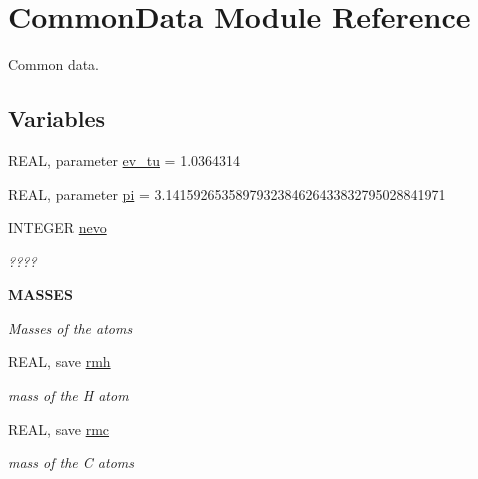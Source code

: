 \hypertarget{namespace_common_data}{
\section{CommonData Module Reference}
\label{namespace_common_data}
}


Common data.  
\subsection*{Variables}
\begin{DoxyCompactItemize}
\item 
REAL, parameter \hyperlink{namespace_common_data_a425e3890d3344a540420425e443dc800}{ev\_\-tu} = 1.0364314
\item 
REAL, parameter \hyperlink{namespace_common_data_a565ffab49e04f2d30ebed2b70485cbb2}{pi} = 3.1415926535897932384626433832795028841971
\item 
INTEGER \hyperlink{namespace_common_data_a976b903826d3d0278c77a43ee3d29754}{nevo}
\begin{DoxyCompactList}\small\item\em ???? \item\end{DoxyCompactList}\end{DoxyCompactItemize}
\begin{Indent}{\bf MASSES}\par
{\em \label{_amgrpc6c04a786e5ad5cf1e19a4894db38501}
Masses of the atoms }\begin{DoxyCompactItemize}
\item 
REAL, save \hyperlink{namespace_common_data_ab83fa563208d5b60c511fb8561b4cf02}{rmh}
\begin{DoxyCompactList}\small\item\em mass of the H atom \item\end{DoxyCompactList}\item 
REAL, save \hyperlink{namespace_common_data_a5d2cb89262577c7e0271959b185d97f8}{rmc}
\begin{DoxyCompactList}\small\item\em mass of the C atoms \item\end{DoxyCompactList}\end{DoxyCompactItemize}
\end{Indent}
